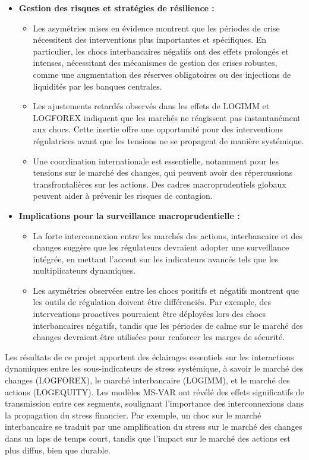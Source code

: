\begin{itemize}
    \item \textbf{Gestion des risques et stratégies de résilience :}
    \begin{itemize}
        \item Les asymétries mises en évidence montrent que les périodes de crise nécessitent des interventions plus importantes et spécifiques. En particulier, les chocs interbancaires négatifs ont des effets prolongés et intenses, nécessitant des mécanismes de gestion des crises robustes, comme une augmentation des réserves obligatoires ou des injections de liquidités par les banques centrales.
        \item Les ajustements retardés observés dans les effets de LOGIMM et LOGFOREX indiquent que les marchés ne réagissent pas instantanément aux chocs. Cette inertie offre une opportunité pour des interventions régulatrices avant que les tensions ne se propagent de manière systémique.
        \item Une coordination internationale est essentielle, notamment pour les tensions sur le marché des changes, qui peuvent avoir des répercussions transfrontalières sur les actions. Des cadres macroprudentiels globaux peuvent aider à prévenir les risques de contagion.
    \end{itemize}

    \item \textbf{Implications pour la surveillance macroprudentielle :}
    \begin{itemize}
        \item La forte interconnexion entre les marchés des actions, interbancaire et des changes suggère que les régulateurs devraient adopter une surveillance intégrée, en mettant l'accent sur les indicateurs avancés tels que les multiplicateurs dynamiques.
        \item Les asymétries observées entre les chocs positifs et négatifs montrent que les outils de régulation doivent être différenciés. Par exemple, des interventions proactives pourraient être déployées lors des chocs interbancaires négatifs, tandis que les périodes de calme sur le marché des changes devraient être utilisées pour renforcer les marges de sécurité.
    \end{itemize}
\end{itemize}

Les résultats de ce projet apportent des éclairages essentiels sur les interactions dynamiques entre les sous-indicateurs de stress systémique, à savoir le marché des changes (LOGFOREX), le marché interbancaire (LOGIMM), et le marché des actions (LOGEQUITY). Les modèles MS-VAR ont révélé des effets significatifs de transmission entre ces segments, soulignant l’importance des interconnexions dans la propagation du stress financier. Par exemple, un choc sur le marché interbancaire se traduit par une amplification du stress sur le marché des changes dans un laps de temps court, tandis que l’impact sur le marché des actions est plus diffus, bien que durable.\\

